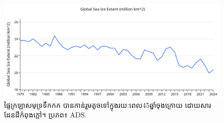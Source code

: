 \documentclass[10pt,twocolumn,letterpaper]{article}
\renewcommand{\refname}{ឯកសារយោង}
\begin{document}
\begin{figure}[t]
\begin{center}
\includegraphics[width=1\textwidth]{ice.jpg}
\end{center}
   \caption{ផ្ទៃក្រឡាសមុទ្រទឹកកក បានកាន់រួមតូចទៅក្នុងរយៈពេល45ឆ្នាំចុងក្រោយ ដោយសារដែនដីកំពុងក្ដៅ។ ប្រភព៖ ADS\cite{149}.}
\label{fig:24}
\end{figure}

\clearpage
\twocolumn

{\small
\renewcommand{\refname}{ឯកសារយោង}


}
\end{document}
